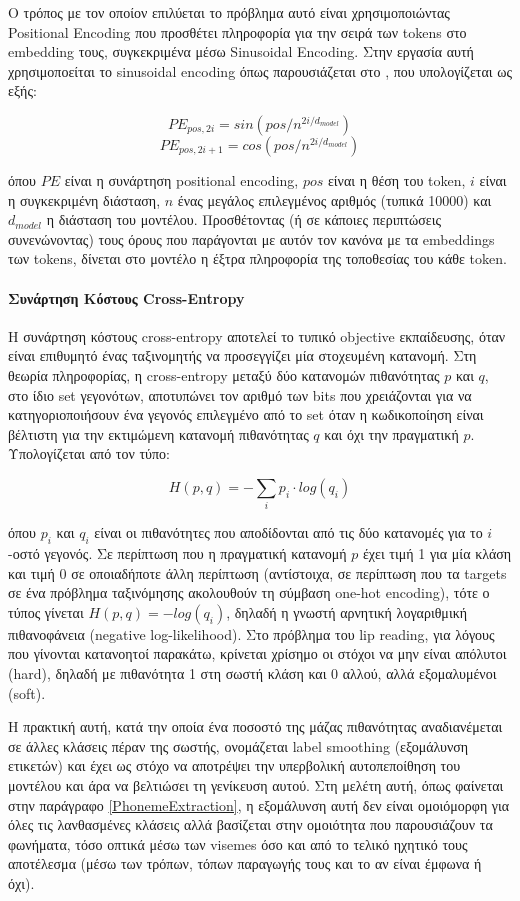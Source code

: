 Ο τρόπος με τον οποίον επιλύεται το πρόβλημα αυτό είναι χρησιμοποιώντας Positional Encoding που προσθέτει πληροφορία για την σειρά των tokens στο embedding τους, συγκεκριμένα μέσω Sinusoidal Encoding. Στην εργασία αυτή χρησιμοποείται το sinusoidal encoding όπως παρουσιάζεται στο \cite{vaswani2023attentionneed}, που υπολογίζεται ως εξής:

\[
PE_{pos,2i} = sin(pos/n^{2i/d_{model}})
\]
\[
PE_{pos,2i+1} = cos(pos/n^{2i/d_{model}})
\]

όπου $PE$ είναι η συνάρτηση positional encoding, $pos$ είναι η θέση του token, $i$ είναι η συγκεκριμένη διάσταση, $n$ ένας μεγάλος επιλεγμένος αριθμός (τυπικά 10000) και $d_{model}$ η διάσταση του μοντέλου. Προσθέτοντας (ή σε κάποιες περιπτώσεις συνενώνοντας) τους όρους που παράγονται με αυτόν τον κανόνα με τα embeddings των tokens, δίνεται στο μοντέλο η έξτρα πληροφορία της τοποθεσίας του κάθε token.

\paragraph{Συνάρτηση Κόστους Cross-Entropy}

Η συνάρτηση κόστους cross-entropy αποτελεί το τυπικό objective εκπαίδευσης, όταν είναι επιθυμητό ένας ταξινομητής να προσεγγίζει μία στοχευμένη κατανομή. Στη θεωρία πληροφορίας, η cross-entropy μεταξύ δύο κατανομών πιθανότητας $p$ και $q$, στο ίδιο set γεγονότων, αποτυπώνει τον αριθμό των bits που χρειάζονται για να κατηγοριοποιήσουν ένα γεγονός επιλεγμένο από το set όταν η κωδικοποίηση είναι βέλτιστη για την εκτιμώμενη κατανομή πιθανότητας $q$ και όχι την πραγματική $p$. Υπολογίζεται από τον τύπο:

\[
H(p,q) = - \sum_{i}p_i \cdot log(q_i)
\]

όπου $p_i$ και $q_i$ είναι οι πιθανότητες που αποδίδονται από τις δύο κατανομές για το $i$-οστό γεγονός. Σε περίπτωση που η πραγματική κατανομή $p$ έχει τιμή 1 για μία κλάση και τιμή 0 σε οποιαδήποτε άλλη περίπτωση (αντίστοιχα, σε περίπτωση που τα targets σε ένα πρόβλημα ταξινόμησης ακολουθούν τη σύμβαση one-hot encoding), τότε ο τύπος γίνεται $H(p,q) = -log(q_i)$, δηλαδή η γνωστή αρνητική λογαριθμική πιθανοφάνεια (negative log-likelihood). Στο πρόβλημα του lip reading, για λόγους που γίνονται κατανοητοί παρακάτω, κρίνεται χρίσημο οι στόχοι να μην είναι απόλυτοι (hard), δηλαδή με πιθανότητα 1 στη σωστή κλάση και 0 αλλού, αλλά εξομαλυμένοι (soft).

Η πρακτική αυτή, κατά την οποία ένα ποσοστό της μάζας πιθανότητας αναδιανέμεται σε άλλες κλάσεις πέραν της σωστής, ονομάζεται label smoothing (εξομάλυνση ετικετών) και έχει ως στόχο να αποτρέψει την υπερβολική αυτοπεποίθηση του μοντέλου και άρα να βελτιώσει τη γενίκευση αυτού. Στη μελέτη αυτή, όπως φαίνεται στην παράγραφο \ref{PhonemeExtraction}, η εξομάλυνση αυτή δεν είναι ομοιόμορφη για όλες τις λανθασμένες κλάσεις αλλά βασίζεται στην ομοιότητα που παρουσιάζουν τα φωνήματα, τόσο οπτικά μέσω των visemes όσο και από το τελικό ηχητικό τους αποτέλεσμα (μέσω των τρόπων, τόπων παραγωγής τους και το αν είναι έμφωνα ή όχι).

